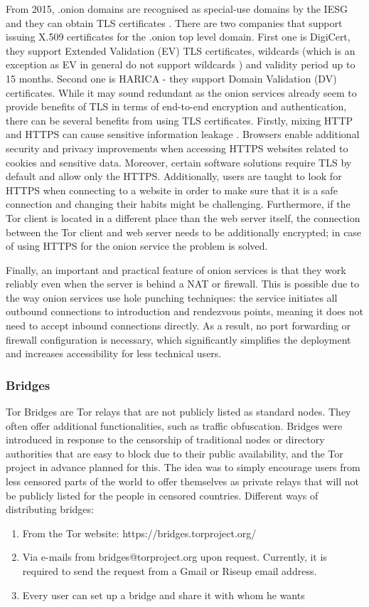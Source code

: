 From 2015, .onion domains are recognised as special-use domains by the IESG and they can obtain TLS certificates \cite{rfc-onion-domain}. There are two companies that support issuing X.509 certificates for the .onion top level domain. First one is DigiCert, they support Extended Validation (EV) TLS certificates,  wildcards (which is an exception as EV in general do not support wildcards \cite{digicert}) and validity period up to 15 months. Second one is HARICA - they support Domain Validation (DV) certificates. While it may sound redundant as the onion services already seem to provide benefits of TLS in terms of end-to-end encryption and authentication, there can be several benefits from using TLS certificates. Firstly, mixing HTTP and HTTPS can cause sensitive information leakage \cite{harica}. Browsers enable additional security and privacy improvements when accessing HTTPS websites related to cookies and sensitive data. Moreover, certain software solutions require TLS by default and allow only the HTTPS. Additionally, users are taught to look for HTTPS when connecting to a website in order to make sure that it is a safe connection and changing their habits might be challenging. Furthermore, if the Tor client is located in a different place than the web server itself, the connection between the Tor client and web server needs to be additionally encrypted; in case of using HTTPS for the onion service the problem is solved.

Finally, an important and practical feature of onion services is that they work reliably even when the server is behind a NAT or firewall. This is possible due to the way onion services use hole punching techniques: the service initiates all outbound connections to introduction and rendezvous points, meaning it does not need to accept inbound connections directly. As a result, no port forwarding or firewall configuration is necessary, which significantly simplifies the deployment and increases accessibility for less technical users.

\subsubsection{Bridges}
Tor Bridges are Tor relays that are not publicly listed as standard nodes. They often offer additional functionalities, such as traffic obfuscation. Bridges were introduced in response to the censorship of traditional nodes or directory authorities that are easy to block due to their public availability, and the Tor project in advance planned for this. The idea was to simply encourage users from less censored parts of the world to offer themselves as private relays that will not be publicly listed for the people in censored countries.
Different ways of distributing bridges:
\begin{enumerate}
    \item From the Tor website: https://bridges.torproject.org/
    \item Via e-mails from bridges@torproject.org upon request. Currently, it is required to send the request from a Gmail or Riseup email address.
    \item Every user can set up a bridge and share it with whom he wants
\end{enumerate}

